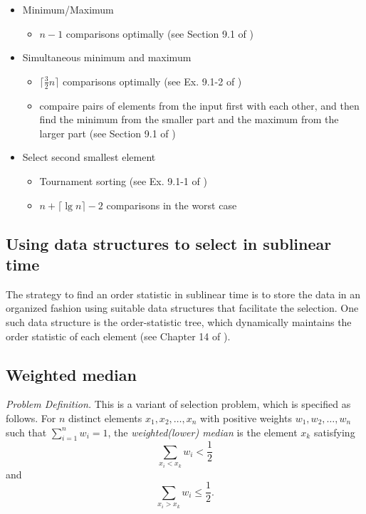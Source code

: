 \documentclass[12pt]{article}
\begin{document}
\begin{itemize}
    \item Minimum/Maximum
        \begin{itemize}
            \item $n-1$ comparisons optimally (see Section 9.1 of
                    \cite{clrs2})
        \end{itemize}
    \item Simultaneous minimum and maximum
        \begin{itemize}
            \item $\lceil \frac{3}{2}n\rceil$ comparisons optimally (see
                    Ex. 9.1-2 of \cite{clrs2})
            \item compaire pairs of elements from the input first with each
            other, and then find the minimum from the smaller part and the
            maximum from the larger part (see Section 9.1 of \cite{clrs2})
        \end{itemize}
    \item Select second smallest element
        \begin{itemize}
            \item Tournament sorting (see Ex. 9.1-1 of \cite{clrs2})
            \item $n+\lceil\lg n\rceil-2$ comparisons in the worst case
        \end{itemize}
\end{itemize}

\subsection{Using data structures to select in sublinear time}

The strategy to find an order statistic in sublinear time is to store the
data in an organized fashion using suitable data structures that facilitate
the selection.  One such data structure is the order-statistic tree, which
dynamically maintains the order statistic of each element (see Chapter 14
of \cite{clrs2}).

\subsection{Weighted median}

\emph{Problem Definition.}
    This is a variant of selection problem, which is specified as follows.
    For $n$ distinct elements $x_1, x_2, \ldots, x_n$ with positive weights
    $w_1, w_2, \ldots, w_n$ such that $\sum_{i=1}^{n}w_i=1$, the
    {\em weighted(lower) median} is the element $x_k$ satisfying
    \[ \sum_{x_i < x_k}w_i < \frac{1}{2} \]
    and
    \[ \sum_{x_i > x_k}w_i \leq \frac{1}{2}. \]
\end{document}
